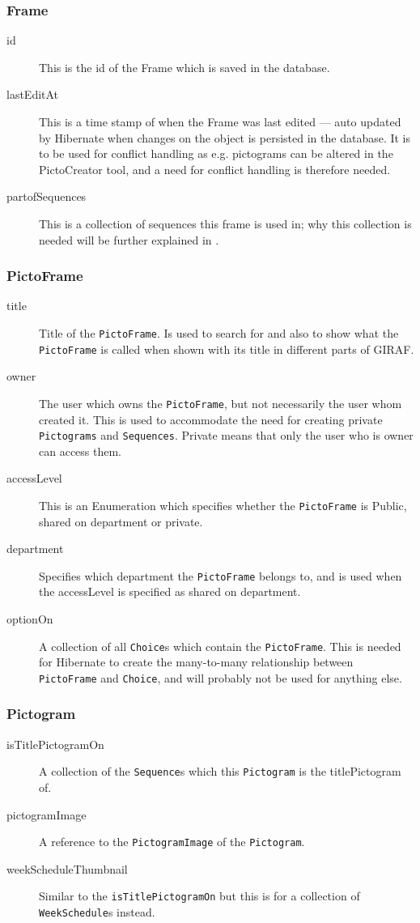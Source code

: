 \subsubsection*{Frame}
	\begin{description}
		\item[id] This is the id of the Frame which is saved in the database.
		\item[lastEditAt] This is a time stamp of when the Frame was last edited --- auto updated by Hibernate when changes on the object is persisted in the database.
		It is to be used for conflict handling as e.g. pictograms can be altered in the PictoCreator tool, and a need for conflict handling is therefore needed.
		\item[partofSequences] This is a collection of sequences this frame is used in; why this collection is needed will be further explained in .
	\end{description}

\subsubsection*{PictoFrame}
	\begin{description}
		\item[title] Title of the \texttt{PictoFrame}. Is used to search for and also to show what the \texttt{PictoFrame} is called when shown with its title in different parts of GIRAF.
		\item[owner] The user which owns the \texttt{PictoFrame}, but not necessarily the user whom created it.
		This is used to accommodate the need for creating private \texttt{Pictograms} and \texttt{Sequences}.
		Private means that only the user who is owner can access them.
		\item[accessLevel] This is an Enumeration which specifies whether the \texttt{PictoFrame} is Public, shared on department or private.
		\item[department] Specifies which department the \texttt{PictoFrame} belongs to, and is used when the accessLevel is specified as shared on department.
		\item[optionOn] A collection of all \texttt{Choice}s which contain the \texttt{PictoFrame}.
		This is needed for Hibernate to create the many-to-many relationship between \texttt{PictoFrame} and \texttt{Choice}, and will probably not be used for anything else.
	\end{description}

\subsubsection*{Pictogram}
	\begin{description}
		\item[isTitlePictogramOn] A collection of the \texttt{Sequence}s which this \texttt{Pictogram} is the titlePictogram of.
		\item[pictogramImage] A reference to the \texttt{PictogramImage} of the \texttt{Pictogram}.
		\item[weekScheduleThumbnail] Similar to the \texttt{isTitlePictogramOn} but this is for a collection of \texttt{WeekSchedule}s instead.
	\end{description}

